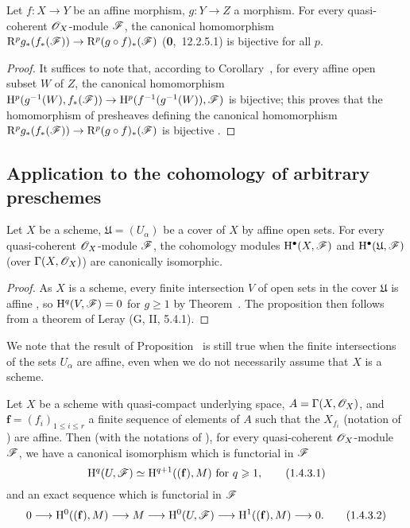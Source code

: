 \begin{corollary}[1.3.4]
\label{III.1.3.4}
Let $f:X\to Y$ be an affine morphism, $g:Y\to Z$ a morphism.
For every quasi-coherent $\mathscr{O}_X$-module $\mathscr{F}$, the canonical homomorphism $\RR^p g_*(f_*(\sh{F}))\to\RR^p(g\circ f)_*(\sh{F})$ (\textbf{0},~12.2.5.1) is bijective for all $p$.
\end{corollary}

\begin{proof}
It suffices to note that, according to Corollary~, for every affine open subset $W$ of $Z$, the canonical homomorphism $\HH^p(g^{-1}(W),f_*(\sh{F}))\to\HH^p(f^{-1}(g^{-1}(W)),\sh{F})$ is bijective; this proves that the homomorphism of presheaves defining the canonical homomorphism $\RR^p g_*(f_*(\sh{F}))\to\RR^p(g\circ f)_*(\sh{F})$ is bijective .
\end{proof}

\subsection{Application to the cohomology of arbitrary preschemes}
\label{subsection:III.1.4}

\begin{proposition}[1.4.1]
\label{III.1.4.1}
Let $X$ be a scheme, $\mathfrak{U}=(U_\alpha)$ be a cover of $X$ by affine open sets.
For every quasi-coherent $\mathscr{O}_X$-module $\mathscr{F}$, the cohomology modules $\mathrm{H}^\bullet(X,\mathscr{F})$ and $\mathrm{H}^\bullet(\mathfrak{U},\mathscr{F})$ (over $\Gamma(X,\mathscr{O}_X)$) are canonically isomorphic.
\end{proposition}

\begin{proof}
As $X$ is a scheme, every finite intersection $V$ of open sets in the cover $\mathfrak{U}$ is affine , so $\mathrm{H}^q(V,\mathscr{F})=0$ for $g\geq 1$ by Theorem~.
The proposition then follows from a theorem of Leray (G, II, 5.4.1).
\end{proof}

\begin{remark}[1.4.2]
\label{III.1.4.2}
We note that the result of Proposition~ is still true when the finite intersections of the sets $U_\alpha$ are affine, even when we do not necessarily assume that $X$ is a scheme.
\end{remark}

\begin{corollary}[1.4.3]
\label{III.1.4.3}
Let $X$ be a scheme with quasi-compact underlying space, $A=\Gamma(X,\mathscr{O}_X)$, and $\mathbf{f}=(f_i)_{1\leq i\leq r}$ a finite sequence of elements of $A$ such that the $X_{f_i}$ (notation of ) are affine.
Then (with the notations of ), for every quasi-coherent $\mathscr{O}_X$-module $\mathscr{F}$, we have a canonical isomorphism which is functorial in $\mathscr{F}$
\[
  \mathrm{H}^q(U,\mathscr{F})\simeq\mathrm{H}^{q+1}((\mathbf{f}),M)\text{ for }q\geqslant 1,
  \tag{1.4.3.1}
\]
and an exact sequence which is functorial in $\mathscr{F}$
\[
  0\to\HH^0((\mathbf{f}),M)\to M\to\HH^0(U,\sh{F})\to\HH^1((\mathbf{f}),M)\to 0.
  \tag{1.4.3.2}
\]
\end{corollary}

